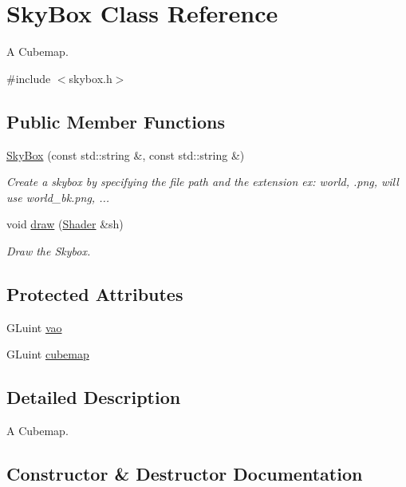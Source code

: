 \hypertarget{classSkyBox}{}\section{Sky\+Box Class Reference}
\label{classSkyBox}


A Cubemap.  




{\ttfamily \#include $<$skybox.\+h$>$}

\subsection*{Public Member Functions}
\begin{DoxyCompactItemize}
\item 
\hyperlink{classSkyBox_ad707af7cdeec0647cebcfb46698790d9}{Sky\+Box} (const std\+::string \&, const std\+::string \&)
\begin{DoxyCompactList}\small\item\em Create a skybox by specifying the file path and the extension ex\+: world, .png, will use world\+\_\+bk.\+png, ... \end{DoxyCompactList}\item 
void \hyperlink{classSkyBox_a366982874c361360c654015e794b1e22}{draw} (\hyperlink{classShader}{Shader} \&sh)
\begin{DoxyCompactList}\small\item\em Draw the Skybox. \end{DoxyCompactList}\end{DoxyCompactItemize}
\subsection*{Protected Attributes}
\begin{DoxyCompactItemize}
\item 
G\+Luint \hyperlink{classSkyBox_af762eed644f128a560e22d5003c5d447}{vao}
\item 
G\+Luint \hyperlink{classSkyBox_ad62d8584917884e9f154421ea637888b}{cubemap}
\end{DoxyCompactItemize}


\subsection{Detailed Description}
A Cubemap. 

\subsection{Constructor \& Destructor Documentation}
\mbox{\label{classSkyBox_ad707af7cdeec0647cebcfb46698790d9}} 
